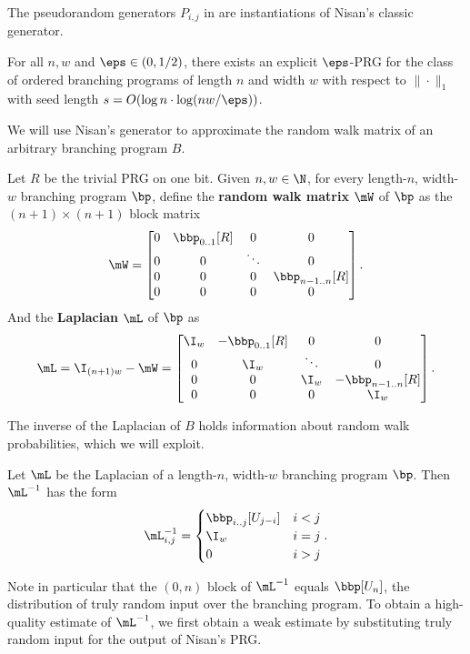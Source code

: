 \documentclass{toc}
\begin{document}
The pseudorandom generators $P_{i,j}$ in  are instantiations
of Nisan's classic generator. %
\begin{theorem}\label{thm:nisan}
    For all $n,w$ and $\eps \in (0,1/2)$, there exists an explicit $\eps$-PRG for the class of ordered branching programs of length $n$ and width $w$ with respect to $\|\cdot\|_{1}$ with seed length $s=O(\log n\cdot \log(nw/\eps))$.
\end{theorem}
We will use Nisan's generator to approximate the random walk matrix of an arbitrary branching program $B$.
\begin{definition}\label{def:pathLap}
Let $R$ be the trivial PRG on one bit. Given $n,w\in \N$, for every length-$n$, width-$w$ branching program $\bp$, define the \textbf{random walk matrix} $\mW$ of $\bp$ as the $(n+1)\times (n+1)$ block matrix
\[\mW=\begin{bmatrix}
0 & \bbp_{0..1}[R] & 0 & 0\\
0 & 0 & \ddots & 0\\
0 & 0 & 0 & \bbp_{n-1..n}[R]\\
0 & 0 & 0 & 0\\
\end{bmatrix}.\]
And the \textbf{Laplacian} $\mL$ of $\bp$ as
\[\mL=\I_{(n+1)w}-\mW=\begin{bmatrix}
\I_w & -\bbp_{0..1}[R] & 0 & 0\\
0 & \I_w & \ddots & 0\\
0 & 0 & \I_w & -\bbp_{n-1..n}[R]\\
0 & 0 & 0 & \I_w\\
\end{bmatrix}.\]
\end{definition}
The inverse of the Laplacian of $B$ holds information about random walk probabilities, which we will exploit.
\begin{remark}\label{rmk:pathLinv}
Let $\mL$ be the Laplacian of a length-$n$, width-$w$ branching program $\bp$. Then $\mL^{-1}$ has the form %
\[\mL^{-1}_{i,j}=\begin{cases}
\bbp_{i..j}[U_{j-i}] & i<j\\
\I_w & i=j\\
0 & i>j
\end{cases}.\] 
\end{remark}
Note in particular that the $(0,n)$ block of $\mL^{-1}$ equals $\bbp[U_n]$, the distribution of truly random input over the branching program. To obtain a high-quality %
estimate of $\mL^{-1}$, we first obtain a weak estimate by substituting truly random input for the output of Nisan's PRG.
\end{document}
